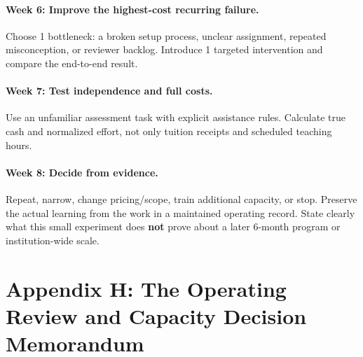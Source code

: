\paragraph*{Week 6: Improve the highest-cost recurring failure.} Choose 1 bottleneck: a broken setup process, unclear assignment, repeated misconception, or reviewer backlog. Introduce 1 targeted intervention and compare the end-to-end result.

\paragraph*{Week 7: Test independence and full costs.} Use an unfamiliar assessment task with explicit assistance rules. Calculate true cash and normalized effort, not only tuition receipts and scheduled teaching hours.

\paragraph*{Week 8: Decide from evidence.} Repeat, narrow, change pricing/scope, train additional capacity, or stop. Preserve the actual learning from the work in a maintained operating record. State clearly what this small experiment does \textbf{not} prove about a later 6-month program or institution-wide scale.

\section*{Appendix H: The Operating Review and Capacity Decision Memorandum}

